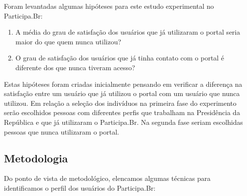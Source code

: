 Foram levantadas algumas hipóteses para este estudo experimental no Participa.Br:
\begin{enumerate}
\item A média do grau de satisfação dos usuários que já utilizaram o portal seria maior do que quem nunca utilizou?

\item O grau de satisfação dos usuários que já tinha contato com o portal é diferente dos que nunca tiveram acesso?
\end{enumerate}

Estas hipóteses foram criadas inicialmente pensando em verificar a diferença na satisfação entre um usuário que já utilizou o portal com um usuário que nunca utilizou.
%
Em relação a seleção dos indivíduos na primeira fase do experimento serão escolhidos pessoas com diferentes perfis que trabalham na Presidência da República e que já utilizaram o Participa.Br. Na segunda fase seriam escolhidas pessoas que nunca utilizaram o portal.

\subsection{Metodologia}

Do ponto de vista de metodológico, elencamos algumas técnicas para identificamos o perfil dos usuários do Participa.Br:

